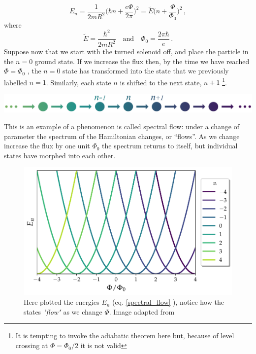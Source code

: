         \begin{equation} \label{spectral_flow}
                E_n=\frac 1{2mR^2}\bigg(\hbar n+ \frac{e\Phi}{2\pi}\bigg)^2=\tilde E\bigg(n+\frac{\Phi}{\Phi_0}\bigg)^2\,,
        \end{equation}
        where
        \[
        \tilde E=\frac{\hbar^2}{2mR^2} \quad \textrm{and} \quad \Phi_0=\frac{2\pi \hbar}e\,.
        \]
        Suppose now that we start with the turned solenoid off, and place the particle in the $n=0$ ground
        state. If we increase the flux then, by the time we have reached $\Phi=\Phi_0$ , the $n=0$ state
        has transformed into the state that we previously labelled $n = 1$. Similarly, each state
        $n$ is shifted to the next state, $n + 1$ \footnote{It is tempting to invoke the adiabatic theorem
        here but, because of level crossing at $\Phi=\Phi_0/2$ it is not valid}.\\
        \begin{minipage}{\textwidth}
         \includegraphics[width=1\linewidth]{Immagini/topo/flow.pdf}
        \end{minipage}
        This is an example of a phenomenon is called spectral flow: under a change of parameter
        the spectrum of the Hamiltonian changes, or “flows”. As we change increase the flux
        by one unit  $\Phi_0$ the spectrum returns to itself, but individual states have morphed into
        each other. \cite{tong2016lectures}
        \begin{figure}[h]
            \includegraphics[width=\linewidth]{Immagini/topo/spectral_flow.pdf}
            \caption{Here plotted the energies $E_n$ (eq. \ref{spectral_flow} ), notice how the states \textit{"flow"} as we change $\Phi$. Image adapted from \cite{tong2016lectures}}
            \label{fig:spectral-flow}
        \end{figure}
